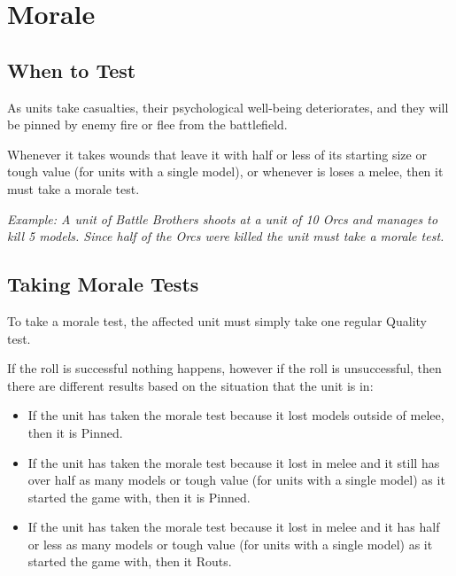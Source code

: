 \documentclass[9pt, a4paper]{extarticle}            %
\begin{document}

\newpage



\section{Morale}

\begin{multicols}{2}

\subsection{When to Test}

As units take casualties, their psychological well-being deteriorates, and they will be pinned by enemy fire or flee from the battlefield.

Whenever it takes wounds that leave it with half or less of its starting size or tough value (for units with a single model), or whenever is loses a melee, then it must take a morale test.

\textit{Example: A unit of Battle Brothers shoots at a unit of 10 Orcs and manages to kill 5 models. Since half of the Orcs were killed the unit must take a morale test.}

\subsection{Taking Morale Tests}

To take a morale test, the affected unit must simply take one regular Quality test.

If the roll is successful nothing happens, however if the roll is unsuccessful, then there are different results based on the situation that the unit is in:

\begin{itemize}
  \item If the unit has taken the morale test because it lost models outside of melee, then it is Pinned.
  \item If the unit has taken the morale test because it lost in melee and it still has over half as many models or tough value (for units with a single model) as it started the game with, then it is Pinned.
  \item If the unit has taken the morale test because it lost in melee and it has half or less as many models or tough value (for units with a single model) as it started the game with, then it Routs.
\end{itemize}


\end{multicols}
\end{document}
